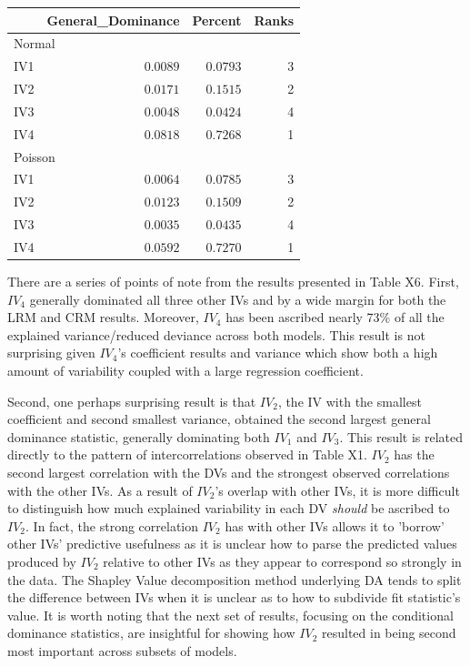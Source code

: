 \documentclass[ShortAfour,times,sageapa]{sagej}
\begin{document}
	\begin{longtable}{l|rrr}
		\toprule
		\multicolumn{1}{l}{} & General\_Dominance & Percent & Ranks \\ 
		\midrule
		\multicolumn{4}{l}{Normal} \\ 
		\midrule
		IV1 & $0.0089$ & $0.0793$ & 3 \\ 
		IV2 & $0.0171$ & $0.1515$ & 2 \\ 
		IV3 & $0.0048$ & $0.0424$ & 4 \\ 
		IV4 & $0.0818$ & $0.7268$ & 1 \\ 
		\midrule
		\multicolumn{4}{l}{Poisson} \\ 
		\midrule
		IV1 & $0.0064$ & $0.0785$ & 3 \\ 
		IV2 & $0.0123$ & $0.1509$ & 2 \\ 
		IV3 & $0.0035$ & $0.0435$ & 4 \\ 
		IV4 & $0.0592$ & $0.7270$ & 1 \\ 
		\bottomrule
	\end{longtable}

	There are a series of points of note from the results presented in Table X6.
	First, $IV_4$ generally dominated all three other IVs and by a wide margin for both the LRM and CRM results.
	Moreover, $IV_4$ has been ascribed nearly 73\% of all the explained variance/reduced deviance across both models.
	This result is not surprising given $IV_4$'s coefficient results and variance which show both a high amount of variability coupled with a large regression coefficient.
	
	Second, one perhaps surprising result is that $IV_2$, the IV with the smallest coefficient and second smallest variance, obtained the second largest general dominance statistic, generally dominating both $IV_1$ and $IV_3$.
	This result is related directly to the pattern of intercorrelations observed in Table X1.
	$IV_2$ has the second largest correlation with the DVs and the strongest observed correlations with the other IVs.  
	As a result of $IV_2$'s overlap with other IVs, it is more difficult to distinguish how much explained variability in each DV \emph{should} be ascribed to $IV_2$.
	In fact, the strong correlation $IV_2$ has with other IVs allows it to 'borrow' other IVs' predictive usefulness as it is unclear how to parse the predicted values produced by $IV_2$ relative to other IVs as they appear to correspond so strongly in the data.
	The Shapley Value decomposition method underlying DA tends to split the difference between IVs when it is unclear as to how to subdivide fit statistic's value.
	It is worth noting that the next set of results, focusing on the conditional dominance statistics, are insightful for showing how $IV_2$ resulted in being second most important across subsets of models.
	
\end{document}
